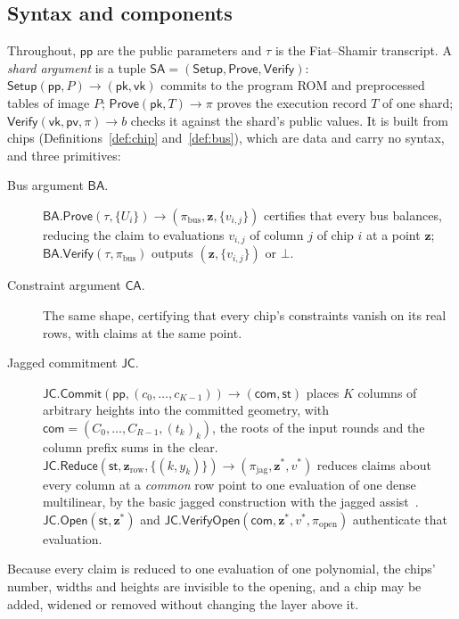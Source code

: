 \subsection{Syntax and components}
\label{sec:argument-components}

Throughout, $\mathsf{pp}$ are the public parameters and $\tau$ is the Fiat--Shamir transcript. A \emph{shard argument} is a tuple $\mathsf{SA} = (\mathsf{Setup}, \mathsf{Prove}, \mathsf{Verify})$: $\mathsf{Setup}(\mathsf{pp}, P) \to (\mathsf{pk}, \mathsf{vk})$ commits to the program ROM and preprocessed tables of image $P$; $\mathsf{Prove}(\mathsf{pk}, T) \to \pi$ proves the execution record $T$ of one shard; $\mathsf{Verify}(\mathsf{vk}, \mathsf{pv}, \pi) \to b$ checks it against the shard's public values. It is built from chips (Definitions~\ref{def:chip} and~\ref{def:bus}), which are data and carry no syntax, and three primitives:

\begin{description}
  \item[Bus argument $\mathsf{BA}$.] $\mathsf{BA.Prove}(\tau, \{U_i\}) \to (\pi_{\mathrm{bus}}, \bm z, \{v_{i,j}\})$ certifies that every bus balances, reducing the claim to evaluations $v_{i,j}$ of column $j$ of chip $i$ at a point $\bm z$; $\mathsf{BA.Verify}(\tau, \pi_{\mathrm{bus}})$ outputs $(\bm z, \{v_{i,j}\})$ or $\bot$.
  \item[Constraint argument $\mathsf{CA}$.] The same shape, certifying that every chip's constraints vanish on its real rows, with claims at the same point.
  \item[Jagged commitment $\mathsf{JC}$.] $\mathsf{JC.Commit}(\mathsf{pp}, (c_0,\dots,c_{K-1})) \to (\mathsf{com}, \mathsf{st})$ places $K$ columns of arbitrary heights into the committed geometry, with $\mathsf{com} = (C_0, \ldots, C_{R-1}, (t_k)_k)$, the roots of the input rounds and the column prefix sums in the clear. $\mathsf{JC.Reduce}(\mathsf{st}, \bm z_{\mathrm{row}}, \{(k, y_k)\}) \to (\pi_{\mathrm{jag}}, \bm z^{*}, v^{*})$ reduces claims about every column at a \emph{common} row point to one evaluation of one dense multilinear, by the basic jagged construction with the jagged assist~\citep[Thms.~1.4, 1.5]{jagged-pcs}. $\mathsf{JC.Open}(\mathsf{st}, \bm z^{*})$ and $\mathsf{JC.VerifyOpen}(\mathsf{com}, \bm z^{*}, v^{*}, \pi_{\mathrm{open}})$ authenticate that evaluation.
\end{description}

Because every claim is reduced to one evaluation of one polynomial, the chips' number, widths and heights are invisible to the opening, and a chip may be added, widened or removed without changing the layer above it.

